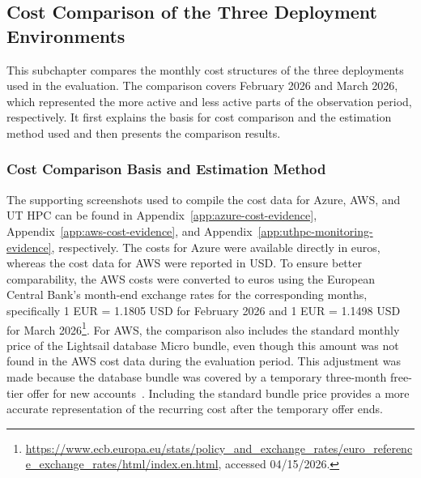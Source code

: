 \subsection{Cost Comparison of the Three Deployment Environments} \label{subsec:cost-comparison-of-the-three-deployment-environments}
This subchapter compares the monthly cost structures of the three deployments used in the evaluation.
The comparison covers February 2026 and March 2026, which represented the more active and less active parts of the observation period, respectively.
It first explains the basis for cost comparison and the estimation method used and then presents the comparison results.

\subsubsection{Cost Comparison Basis and Estimation Method} \label{subsubsec:cost-comparison-basis-and-estimation-method}
The supporting screenshots used to compile the cost data for Azure, AWS, and UT HPC can be found in Appendix~\ref{app:azure-cost-evidence}, Appendix~\ref{app:aws-cost-evidence}, and Appendix~\ref{app:uthpc-monitoring-evidence}, respectively.
The costs for Azure were available directly in euros, whereas the cost data for AWS were reported in USD\@.
To ensure better comparability, the AWS costs were converted to euros using the European Central Bank's month-end exchange rates for the corresponding months, specifically 1 EUR = 1.1805 USD for February 2026 and 1 EUR = 1.1498 USD for March 2026\footnote{\url{https://www.ecb.europa.eu/stats/policy_and_exchange_rates/euro_reference_exchange_rates/html/index.en.html}, accessed 04/15/2026.}.
For AWS, the comparison also includes the standard monthly price of the Lightsail database Micro bundle, even though this amount was not found in the AWS cost data during the evaluation period.
This adjustment was made because the database bundle was covered by a temporary three-month free-tier offer for new accounts~\cite{aws_lightsail_pricing}.
Including the standard bundle price provides a more accurate representation of the recurring cost after the temporary offer ends.

